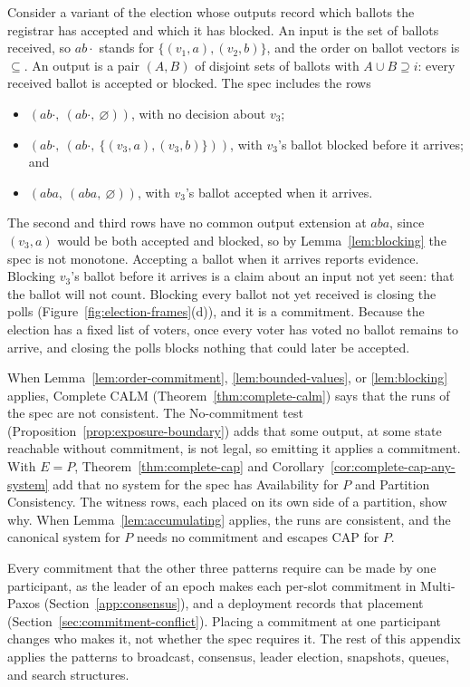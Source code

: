 \documentclass[sigconf]{cidr-2027}
\theoremstyle{remark}
\newcommand{\commitment}{commitment\xspace}
\newcommand{\outnoun}{output extension\xspace}%
\begin{document}
Consider a variant of the election whose outputs record which ballots the
registrar has accepted and which it has blocked. An input is the set of ballots
received, so $ab\cdot$ stands for $\{(v_1,a),(v_2,b)\}$, and the order on
ballot vectors is $\subseteq$. An output is a pair $(A,B)$ of disjoint sets of
ballots with $A\cup B\supseteq i$: every received ballot is accepted or
blocked. The spec includes the rows \begin{itemize} \item $(ab\cdot,\
(ab\cdot,\ \varnothing))$, with no decision about $v_3$; \item $(ab\cdot,\
(ab\cdot,\ \{(v_3,a),(v_3,b)\}))$, with $v_3$'s ballot blocked before it
arrives; and \item $(aba,\ (aba,\ \varnothing))$, with $v_3$'s ballot accepted
when it arrives. \end{itemize} The second and third rows have no common
\outnoun at $aba$, since $(v_3,a)$ would be both accepted and blocked, so by
Lemma~\ref{lem:blocking} the spec is not monotone. Accepting a ballot when it
arrives reports evidence. Blocking $v_3$'s ballot before it arrives is a claim
about an input not yet seen: that the ballot will not count. Blocking every
ballot not yet received is closing the polls
(Figure~\ref{fig:election-frames}(d)), and it is a \commitment. Because the
election has a fixed list of voters, once every voter has voted no ballot
remains to arrive, and closing the polls blocks nothing that could later be
accepted.

When Lemma~\ref{lem:order-commitment}, \ref{lem:bounded-values}, or
\ref{lem:blocking} applies, Complete CALM (Theorem~\ref{thm:complete-calm})
says that the runs of the spec are not consistent. The No-\commitment test
(Proposition~\ref{prop:exposure-boundary}) adds that some output, at some state
reachable without \commitment, is not legal, so emitting it applies a
\commitment. With $E=P$, Theorem~\ref{thm:complete-cap} and
Corollary~\ref{cor:complete-cap-any-system} add that no system for the spec has
Availability for $P$ and Partition Consistency. The witness rows, each placed
on its own side of a partition, show why. When Lemma~\ref{lem:accumulating}
applies, the runs are consistent, and the canonical system for $P$ needs no
\commitment and escapes CAP for $P$.

Every \commitment that the other three patterns require can be made by one
participant, as the leader of an epoch makes each per-slot \commitment in
Multi-Paxos (Section~\ref{app:consensus}), and a deployment records that
placement (Section~\ref{sec:commitment-conflict}). Placing a \commitment at
one participant changes who makes it, not whether the spec requires it. The
rest of this appendix applies the patterns to broadcast, consensus, leader
election, snapshots, queues, and search structures.
\end{document}
